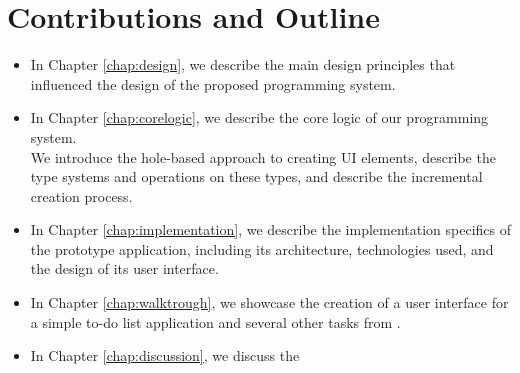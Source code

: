 \newpage
\section* {Contributions and Outline}
\begin{itemize}
	\item In Chapter \ref{chap:design}, we describe the main design principles that influenced the design of the proposed programming system.
	\item {In Chapter \ref{chap:corelogic}, we describe the core logic of our programming system.\\
	      We introduce the hole-based approach to creating UI elements, describe the type systems and operations on these types,
	      and describe the incremental creation process.}
	\item In Chapter \ref{chap:implementation}, we describe the implementation specifics of the prototype application, including its architecture, technologies used, and the design of its user interface.
	\item In Chapter \ref{chap:walktrough}, we showcase the creation of a user interface for a simple to-do list application and several other tasks from \citet{7GUIs-web}.
	\item In Chapter \ref{chap:discussion}, we discuss the
\end{itemize}
